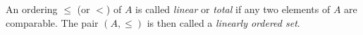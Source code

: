 \documentclass[12pt]{article}
\begin{document}
An ordering $\le$ (or $<$) of $A$ is called \emph{linear} or \emph{total} if any two elements of $A$ are comparable.  The pair $(A,\le)$ is then called a \emph{linearly ordered set}.
\end{document}
